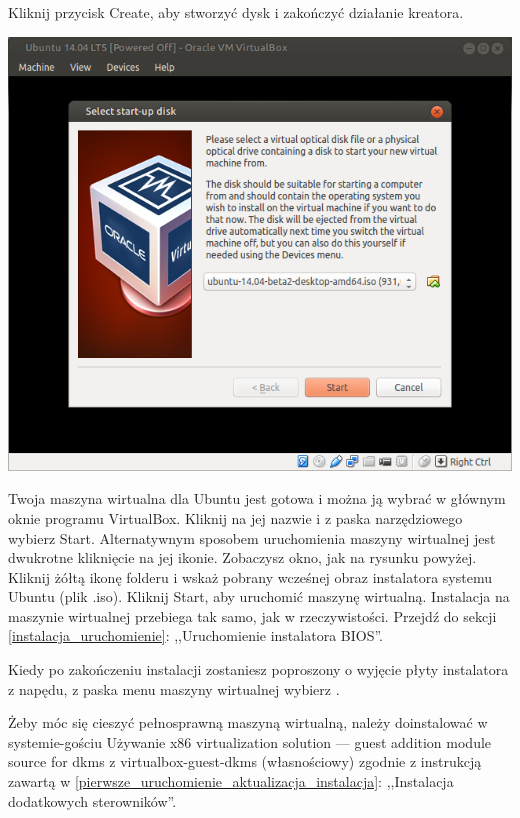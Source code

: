 Kliknij przycisk \textcolor{ubuntu_orange}{Create}, aby stworzyć dysk i zakończyć działanie kreatora.
\clearpage
\begin{center}
	\includegraphics[width=\linewidth]{images/virtualbox_start.png}
\end{center}

Twoja maszyna wirtualna dla Ubuntu jest gotowa i można ją wybrać w głównym oknie programu VirtualBox. Kliknij na jej nazwie i z paska narzędziowego wybierz \textcolor{ubuntu_orange}{Start}. Alternatywnym sposobem uruchomienia maszyny wirtualnej jest dwukrotne kliknięcie na jej ikonie. Zobaczysz okno, jak na rysunku powyżej. Kliknij żółtą ikonę folderu i wskaż pobrany wcześnej obraz instalatora systemu Ubuntu (plik .iso). Kliknij \textcolor{ubuntu_orange}{Start}, aby uruchomić maszynę wirtualną. Instalacja na maszynie wirtualnej przebiega tak samo, jak w rzeczywistości. Przejdź do sekcji \ref{instalacja_uruchomienie}: ,,Uruchomienie instalatora BIOS''.

Kiedy po zakończeniu instalacji zostaniesz poproszony o wyjęcie płyty instalatora z napędu, z paska menu maszyny wirtualnej wybierz .

Żeby móc się cieszyć pełnosprawną maszyną wirtualną, należy doinstalować w systemie-gościu \textcolor{ubuntu_orange}{Używanie x86 virtualization solution --- guest addition module source for dkms z virtualbox-guest-dkms (własnościowy)} zgodnie z instrukcją zawartą w \ref{pierwsze_uruchomienie_aktualizacja_instalacja}: ,,Instalacja dodatkowych sterowników''.
\clearpage
